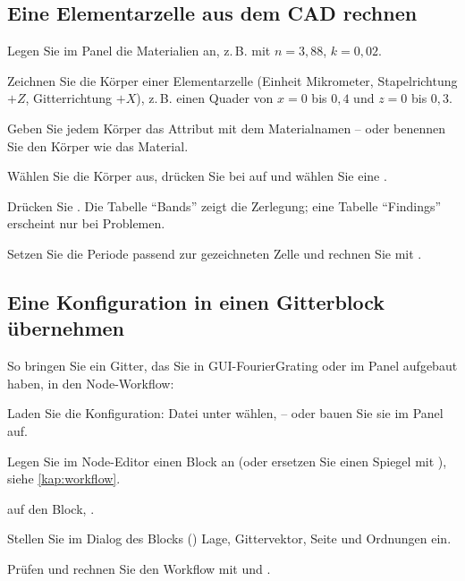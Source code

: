 \subsection{Eine Elementarzelle aus dem CAD rechnen}

\begin{schritte}
  \item Legen Sie im Panel die Materialien an, z.\,B.  mit $n = 3{,}88$, $k = 0{,}02$.
  \item Zeichnen Sie die Körper einer Elementarzelle (Einheit Mikrometer, Stapelrichtung $+Z$,
    Gitterrichtung $+X$), z.\,B. einen Quader von $x = 0$ bis $0{,}4$ und $z = 0$ bis $0{,}3$.
  \item Geben Sie jedem Körper das Attribut  mit dem Materialnamen -- oder benennen
    Sie den Körper wie das Material.
  \item Wählen Sie die Körper aus, drücken Sie bei  auf  und wählen
    Sie eine .
  \item Drücken Sie . Die Tabelle \enquote{Bands} zeigt die Zerlegung;
    eine Tabelle \enquote{Findings} erscheint nur bei Problemen.
  \item Setzen Sie die Periode passend zur gezeichneten Zelle und rechnen Sie mit .
\end{schritte}

\subsection{Eine Konfiguration in einen Gitterblock übernehmen}

So bringen Sie ein Gitter, das Sie in GUI-FourierGrating oder im Panel aufgebaut haben, in den
Node-Workflow:

\begin{schritte}
  \item Laden Sie die Konfiguration: Datei unter  wählen, 
    -- oder bauen Sie sie im Panel auf.
  \item Legen Sie im Node-Editor einen Block  an (oder ersetzen Sie einen Spiegel
    mit ), siehe \autoref{kap:workflow}.
  \item {} auf den Block, .
  \item Stellen Sie im Dialog des Blocks () Lage, Gittervektor, Seite und Ordnungen
    ein.
  \item Prüfen und rechnen Sie den Workflow mit  und .
\end{schritte}

